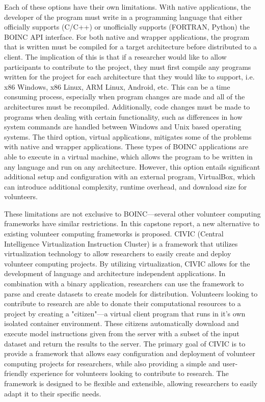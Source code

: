 \documentclass[11pt]{article}
\begin{document}
Each of these options have their own limitations. With native applications, the developer of the program must write in a programming language that either officially supports (C/C++) or unofficially supports (FORTRAN, Python) the BOINC API interface. For both native and wrapper applications, the program that is written must be compiled for a target architecture before distributed to a client. The implication of this is that if a researcher would like to allow participants to contribute to the project, they must first compile any programs written for the project for each architecture that they would like to support, i.e. x86 Windows, x86 Linux, ARM Linux, Android, etc. This can be a time consuming process, especially when program changes are made and all of the architectures must be recompiled. Additionally, code changes must be made to programs when dealing with certain functionality, such as differences in how system commands are handled between Windows and Unix based operating systems. The third option, virtual applications, mitigates some of the problems with native and wrapper applications. These types of BOINC applications are able to execute in a virtual machine, which allows the program to be written in any language and run on any architecture. However, this option entails significant additional setup and configuration with an external program, VirtualBox, which can introduce additional complexity, runtime overhead, and download size for volunteers.

These limitations are not exclusive to BOINC---several other volunteer computing frameworks have similar restrictions. In this capstone report, a new alternative to existing volunteer computing frameworks is proposed. CIVIC (Central Intelligence Virtualization Instruction Cluster) is a framework that utilizes virtualization technology to allow researchers to easily create and deploy volunteer computing projects. By utilizing virtualization, CIVIC allows for the development of language and architecture independent applications. In combination with a binary application, researchers can use the framework to parse and create datasets to create models for distribution. Volunteers looking to contribute to research are able to donate their computational resources to a project by creating a "citizen"---a virtual client program that runs in it's own isolated container environment. These citizens automatically download and execute model instructions given from the server with a subset of the input dataset and return the results to the server. The primary goal of CIVIC is to provide a framework that allows easy configuration and deployment of volunteer computing projects for researchers, while also providing a simple and user-friendly experience for volunteers looking to contribute to research. The framework is designed to be flexible and extensible, allowing researchers to easily adapt it to their specific needs.
\end{document}

